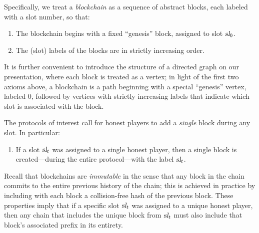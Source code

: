 Specifically, we treat a \emph{blockchain} as
a sequence of abstract blocks, each labeled with a slot number, so
that:
\begin{enumerate}[label={\textbf{A\arabic*}}., series=axiom]
\item The blockchain begins with a fixed ``genesis'' block, assigned to slot $\textsl{sl}_0$.
\item The (slot) labels of the blocks are in strictly increasing order.
\end{enumerate}
It is further convenient to introduce the structure of a directed
graph on our presentation, where each block is treated as a vertex; in
light of the first two axioms above, a blockchain is a path beginning
with a special ``genesis'' vertex, labeled $0$, followed by vertices
with strictly increasing labels that indicate which slot is associated
with the block. %
\begin{center}
\end{center}
The protocols of interest call for honest players to add a
\emph{single} block %
during any slot. In particular:
\begin{enumerate}[label={\textbf{A\arabic*}}., resume=axiom]
\item If a slot $\textsl{sl}_t$ was assigned to a single honest player, 
then a single block is created---during the entire protocol---with the label $\textsl{sl}_t$.
\end{enumerate}
Recall that blockchains are \emph{immutable} in the sense that any
block in the chain commits to the entire previous history of the
chain; this is achieved in practice by including with each block a
collision-free hash of the previous block. These properties imply that
if a specific slot $\textsl{sl}_t$ was assigned to a unique honest player,
then any chain that includes the unique block from $\textsl{sl}_t$ must also include
that block's associated prefix in its entirety.

